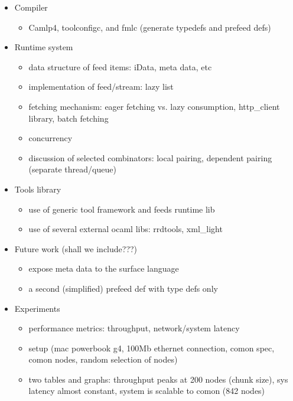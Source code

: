 \begin{itemize}
\item Compiler
  \begin{itemize}
  \item Camlp4, toolconfigc, and fmlc (generate typedefs and prefeed defs) 
  \end{itemize}

\item Runtime system
  \begin{itemize}
  \item data structure of feed items: iData, meta data, etc
  \item implementation of feed/stream: lazy list
  \item fetching mechanism: eager fetching vs. lazy consumption, 
    http\_client library, batch fetching
  \item concurrency
  \item discussion of selected combinators: local pairing, 
    dependent pairing (separate thread/queue)
  \end{itemize}

\item Tools library
  \begin{itemize}
  \item use of generic tool framework and feeds runtime lib
  \item use of several external ocaml libs: rrdtools, xml\_light
  \end{itemize}

\item Future work (shall we include???)
  \begin{itemize}
  \item expose meta data to the surface language
  \item a second (simplified) prefeed def with type defs only
  \end{itemize}

\item Experiments
  \begin{itemize}
  \item performance metrics: throughput, network/system latency
  \item setup (mac powerbook g4, 100Mb ethernet connection, 
    comon spec, comon nodes, random selection of nodes)
  \item two tables and graphs: throughput peaks at 
    200 nodes (chunk size), sys latency almost constant,
    system is scalable to comon (842 nodes)
  \end{itemize}
\end{itemize}

